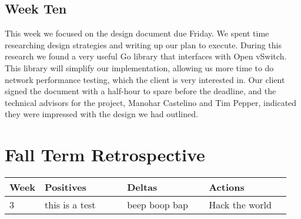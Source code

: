 \documentclass[10pt,onecolumn,journal,draftclsnofoot]{IEEEtran}
\begin{document}
\subsection{Week Ten}

This week we focused on the design document due Friday. We spent time
researching design strategies and writing up our plan to execute. During this
research we found a very useful Go library that interfaces with Open vSwitch.
This library will simplify our implementation, allowing us more time to do
network performance testing, which the client is very interested in. Our client
signed the document with a half-hour to spare before the deadline, and the
technical advisors for the project, Manohar Castelino and Tim Pepper, indicated
they were impressed with the design we had outlined.

\section{Fall Term Retrospective}

\begin{center}
	\begin{tabular}{| p{0.05\linewidth} | p{0.3\linewidth} | p{0.3\linewidth} | p{0.3\linewidth} |}\hline
		Week & Positives & Deltas & Actions \\ \hline
		3 & this is a test  & beep boop bap & Hack the world \\ \hline
	\end{tabular}
\end{center}
\end{document}
